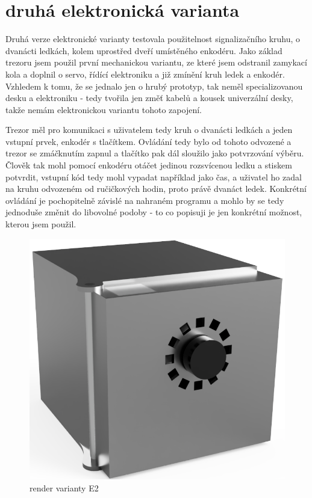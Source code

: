 \section*{druhá elektronická varianta}

Druhá verze elektronické varianty testovala použitelnost signalizačního kruhu, o dvanácti ledkách, kolem uprostřed dveří
umístěného enkodéru. Jako základ trezoru jsem použil první mechanickou variantu, ze které jsem odstranil zamykací kola 
a doplnil o servo, řídící elektroniku a již zmínění kruh ledek a enkodér.
Vzhledem k tomu, že se jednalo jen o hrubý prototyp, tak neměl specializovanou desku a elektroniku - tedy tvořila jen změť kabelů 
a kousek univerzální desky, takže nemám elektronickou variantu tohoto zapojení. %

Trezor měl pro komunikaci s uživatelem tedy kruh o dvanácti ledkách a jeden vstupní prvek, enkodér s tlačítkem.
Ovládání tedy bylo od tohoto odvozené a trezor se zmáčknutím zapnul a tlačítko pak dál sloužilo jako potvrzování výběru.
Člověk tak mohl pomocí enkodéru otáčet jedinou rozsvícenou ledku a stiskem potvrdit, vstupní kód tedy mohl vypadat 
například jako čas, a uživatel ho zadal na kruhu odvozeném od ručičkových hodin, proto právě dvanáct ledek.
Konkrétní ovládání je pochopitelně závislé na nahraném programu a mohlo by se tedy jednoduše změnit do libovolné podoby -
to co popisuji je jen konkrétní možnost, kterou jsem použil.

\begin{figure}[htbp]
    \centering
    \includegraphics[width=\textwidth]{kapitoly/obrazky/E2/predni_render.png}
    \caption{render varianty E2}
    \label{fig:E2-render}
\end{figure}

\newpage